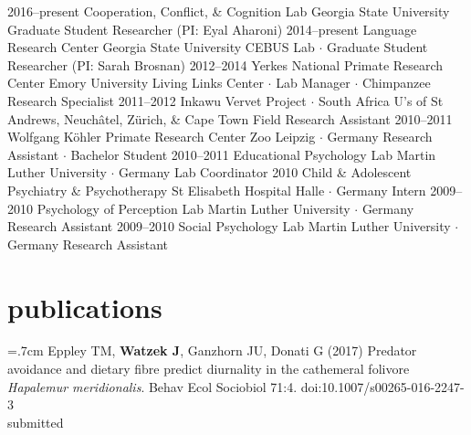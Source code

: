 \documentclass[]{friggeri-cv}
\begin{document}
\begin{entrylist}
  \entry
    {2016--present}
    {Cooperation, Conflict, \& Cognition Lab}
    {Georgia State University}
    {Graduate Student Researcher (PI: Eyal Aharoni)}
  \entry
    {2014--present}
    {Language Research Center}
    {Georgia State University}
    {CEBUS Lab $\cdot$ Graduate Student Researcher (PI: Sarah Brosnan)}
  \entry
    {2012--2014}
    {Yerkes National Primate Research Center}
    {Emory University}
    {Living Links Center $\cdot$ Lab Manager $\cdot$ Chimpanzee Research Specialist}
  \entry
    {2011--2012}
    {Inkawu Vervet Project $\cdot$ South Africa}
    {U's of St Andrews, Neuch\^{a}tel, Z\"urich, \& Cape Town}
    {Field Research Assistant}
  \entry
    {2010--2011}
    {Wolfgang K\"{o}hler Primate Research Center}
    {Zoo Leipzig $\cdot$ Germany}
    {Research Assistant $\cdot$ Bachelor Student}
  \entry
    {2010--2011}
    {Educational Psychology Lab}
    {Martin Luther University $\cdot$ Germany}
    {Lab Coordinator}
  \entry
    {2010}
    {Child \& Adolescent Psychiatry \& Psychotherapy}
    {St Elisabeth Hospital Halle $\cdot$ Germany}
    {Intern}
  \entry
    {2009--2010}
    {Psychology of Perception Lab}
    {Martin Luther University $\cdot$ Germany}
    {Research Assistant}
  \entry
    {2009--2010}
    {Social Psychology Lab}
    {Martin Luther University $\cdot$ Germany}
    {Research Assistant}
\end{entrylist}


\newpage
\thispagestyle{fancy}

\section{publications}


\hangindent=.7cm Eppley TM, \textbf{Watzek J}, Ganzhorn JU, Donati G (2017) Predator avoidance and dietary fibre predict diurnality in the cathemeral folivore \emph{Hapalemur meridionalis}. Behav Ecol Sociobiol 71:4. doi:10.1007/s00265-016-2247-3 \\[-.1cm]

{\large{} submitted}
\end{document}
